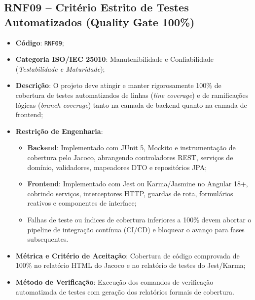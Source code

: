 \subsection{RNF09 -- Critério Estrito de Testes Automatizados (Quality Gate 100\%)}
\begin{itemize}
    \item \textbf{Código}: \texttt{RNF09};
    \item \textbf{Categoria ISO/IEC 25010}: Manutenibilidade e Confiabilidade (\textit{Testabilidade e Maturidade});
    \item \textbf{Descrição}: O projeto deve atingir e manter rigorosamente 100\% de cobertura de testes automatizados de linhas (\textit{line coverage}) e de ramificações lógicas (\textit{branch coverage}) tanto na camada de backend quanto na camada de frontend;
    \item \textbf{Restrição de Engenharia}:
    \begin{itemize}
        \item \textbf{Backend}: Implementado com JUnit 5, Mockito e instrumentação de cobertura pelo Jacoco, abrangendo controladores REST, serviços de domínio, validadores, mapeadores DTO e repositórios JPA;
        \item \textbf{Frontend}: Implementado com Jest ou Karma/Jasmine no Angular 18+, cobrindo serviços, interceptores HTTP, guardas de rota, formulários reativos e componentes de interface;
        \item Falhas de teste ou índices de cobertura inferiores a 100\% devem abortar o pipeline de integração contínua (CI/CD) e bloquear o avanço para fases subsequentes.
    \end{itemize}
    \item \textbf{Métrica e Critério de Aceitação}: Cobertura de código comprovada de 100\% no relatório HTML do Jacoco e no relatório de testes do Jest/Karma;
    \item \textbf{Método de Verificação}: Execução dos comandos de verificação automatizada de testes com geração dos relatórios formais de cobertura.
\end{itemize}

